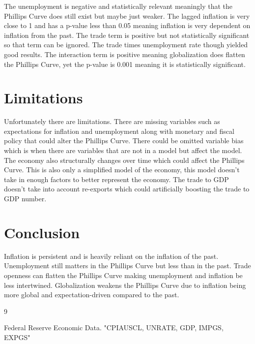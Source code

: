 \documentclass{article}
\begin{document}
The unemployment is negative and statistically relevant meaningly that the Phillips Curve does still exist but maybe just weaker. The lagged inflation is very close to 1 and has a p-value less than 0.05 meaning inflation is very dependent on inflation from the past. The trade term is positive but not statistically significant so that term can be ignored. The trade times unemployment rate though yielded good results. The interaction term is positive meaning globalization does flatten the Phillips Curve, yet the p-value is 0.001 meaning it is statistically significant.

\section{Limitations}

Unfortunately there are limitations. There are missing variables such as expectations for inflation and unemployment along with monetary and fiscal policy that could alter the Phillips Curve. There could be omitted variable bias which is when there are variables that are not in a model but affect the model. The economy also structurally changes over time which could affect the Phillips Curve. This is also only a simplified model of the economy, this model doesn't take in enough factors to better represent the economy. The trade to GDP doesn't take into account re-exports which could artificially boosting the trade to GDP number.

\section{Conclusion}

Inflation is persistent and is heavily reliant on the inflation of the past. Unemployment still matters in the Phillips Curve but less than in the past. Trade openness can flatten the Phillips Curve making unemployment and inflation be less intertwined. Globalization weakens the Phillips Curve due to inflation being more global and expectation-driven compared to the past. 

\begin{thebibliography}{9}

Federal Reserve Economic Data.
"CPIAUSCL, UNRATE, GDP, IMPGS, EXPGS"

\end{thebibliography}
\end{document}
